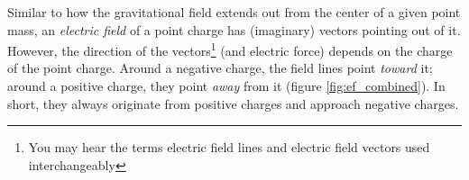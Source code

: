 Similar to how the gravitational field extends out from the center of a given point mass, an \emph{electric field} of a point charge has (imaginary) vectors pointing out of it. However, the direction of the vectors\footnote{You may hear the terms electric field lines and electric field vectors used interchangeably} (and electric force) depends on the charge of the point charge. Around a negative charge, the field lines point \emph{toward} it; around
a positive charge, they point \emph{away} from it (figure
\ref{fig:ef_combined}). In short, they always originate from positive charges and approach negative charges. %


